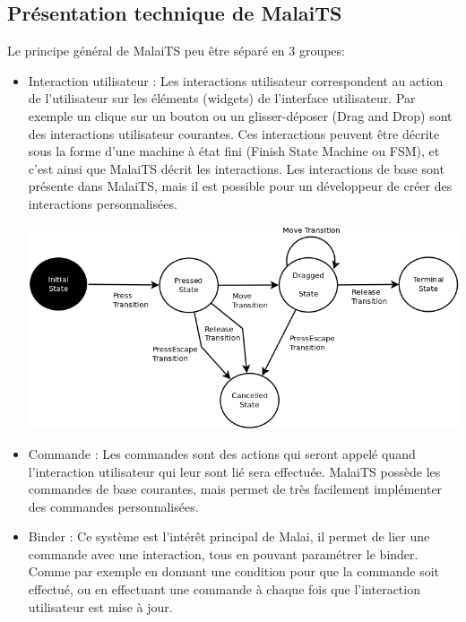 \documentclass[11pt, a4paper, pdftex]{article}
\begin{document}
    \begin{appendices}
        \section{Présentation technique de MalaiTS}\label{sec:presmalaitech}
            Le principe général de MalaiTS peu être séparé en 3 groupes:
            \begin{itemize}
                \item Interaction utilisateur : Les interactions utilisateur correspondent au action de l'utilisateur sur les éléments (widgets) de l'interface utilisateur.
                Par exemple un clique sur un bouton ou un glisser-déposer (Drag and Drop) sont des interactions utilisateur courantes.
                Ces interactions peuvent être décrite sous la forme d'une machine à état fini (Finish State Machine ou FSM), et c'est ainsi que MalaiTS décrit les interactions.
                Les interactions de base sont présente dans MalaiTS, mais il est possible pour un développeur de créer des interactions personnalisées. \par
                    \begin{minipage}{\linewidth}
                        \centering
                        \includegraphics[height=6.0cm]{../assets/DnD.png}
                    \end{minipage}
                \item Commande : Les commandes sont des actions qui seront appelé quand l'interaction utilisateur qui leur sont lié sera effectuée.
                MalaiTS possède les commandes de base courantes, mais permet de très facilement implémenter des commandes personnalisées.
                \item Binder : Ce système est l'intérêt principal de Malai, il permet de lier une commande avec une interaction, tous en pouvant paramétrer le binder.
                Comme par exemple en donnant une condition pour que la commande soit effectué, ou en effectuant une commande à chaque fois que l'interaction utilisateur est mise à jour.
            \end{itemize}

    \end{appendices}
\end{document}
